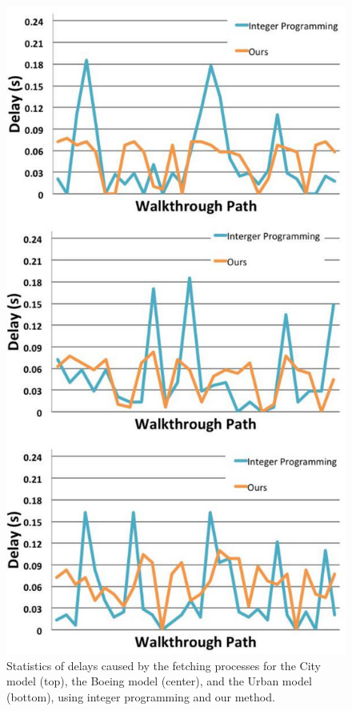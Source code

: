 \begin{figure}[h!]
\centering
\includegraphics[width=\columnwidth]
{comparison_to_linear_programming.pdf}
  \caption{Statistics of delays caused by the fetching processes for the City model (top), the Boeing model (center), and
the Urban model (bottom), using integer programming and our method.}
  \label{fig:linProgramComparison}
\end{figure}

